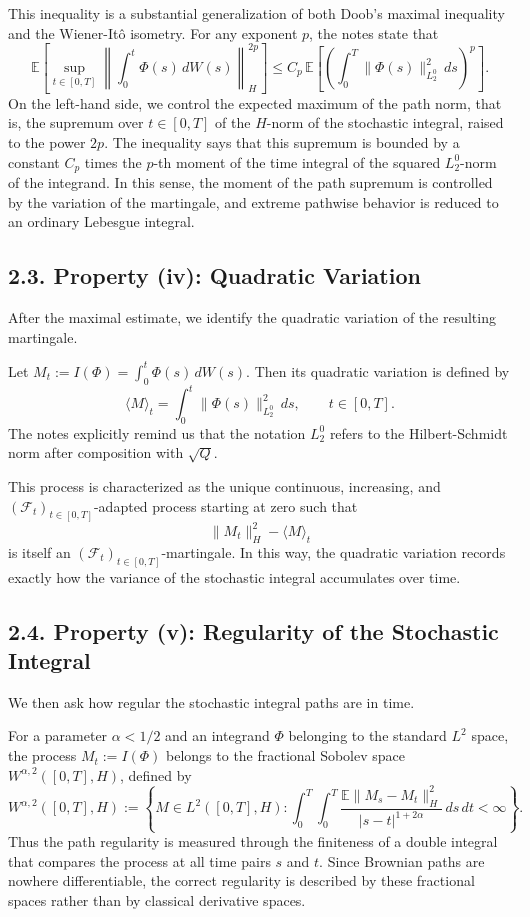 \documentclass[11pt]{article}
\theoremstyle{definition}
\theoremstyle{remark}
\begin{document}
This inequality is a substantial generalization of both Doob's maximal inequality and the Wiener-It\^o isometry. For any exponent \(p\), the notes state that
\[
\mathbb E\left[\sup_{t\in[0,T]}\left\|\int_0^t \Phi(s)\,dW(s)\right\|_H^{2p}\right]
\le
C_p\,\mathbb E\left[\left(\int_0^T \|\Phi(s)\|_{L_2^0}^2\,ds\right)^p\right].
\]
On the left-hand side, we control the expected maximum of the path norm, that is, the supremum over \(t\in[0,T]\) of the \(H\)-norm of the stochastic integral, raised to the power \(2p\). The inequality says that this supremum is bounded by a constant \(C_p\) times the \(p\)-th moment of the time integral of the squared \(L_2^0\)-norm of the integrand. In this sense, the moment of the path supremum is controlled by the variation of the martingale, and extreme pathwise behavior is reduced to an ordinary Lebesgue integral.

\subsection*{2.3. Property (iv): Quadratic Variation}
After the maximal estimate, we identify the quadratic variation of the resulting martingale.

Let \(M_t:=I(\Phi)=\int_0^t \Phi(s)\,dW(s)\). Then its quadratic variation is defined by
\[
\langle M\rangle_t=\int_0^t \|\Phi(s)\|_{L_2^0}^2\,ds,
\qquad t\in[0,T].
\]
The notes explicitly remind us that the notation \(L_2^0\) refers to the Hilbert-Schmidt norm after composition with \(\sqrt Q\).

This process is characterized as the unique continuous, increasing, and \((\mathcal F_t)_{t\in[0,T]}\)-adapted process starting at zero such that
\[
\|M_t\|_H^2-\langle M\rangle_t
\]
is itself an \((\mathcal F_t)_{t\in[0,T]}\)-martingale. In this way, the quadratic variation records exactly how the variance of the stochastic integral accumulates over time.

\subsection*{2.4. Property (v): Regularity of the Stochastic Integral}
We then ask how regular the stochastic integral paths are in time.

For a parameter \(\alpha<1/2\) and an integrand \(\Phi\) belonging to the standard \(L^2\) space, the process \(M_t:=I(\Phi)\) belongs to the fractional Sobolev space \(W^{\alpha,2}([0,T],H)\), defined by
\[
W^{\alpha,2}([0,T],H)
:=
\left\{
M\in L^2([0,T],H):
\int_0^T\int_0^T
\frac{\mathbb E\|M_s-M_t\|_H^2}{|s-t|^{1+2\alpha}}
\,ds\,dt<\infty
\right\}.
\]
Thus the path regularity is measured through the finiteness of a double integral that compares the process at all time pairs \(s\) and \(t\). Since Brownian paths are nowhere differentiable, the correct regularity is described by these fractional spaces rather than by classical derivative spaces.
\end{document}
